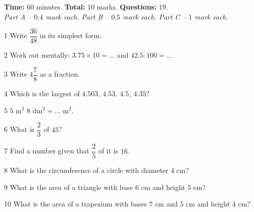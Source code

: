\begin{knowbox}
\textbf{Time:} $60$ minutes. \quad \textbf{Total:} $10$ marks. \quad \textbf{Questions:} $19$.\\[2pt]\emph{Part A -- $0.4$ mark each. \quad Part B -- $0.5$ mark each. \quad Part C -- $1$ mark each.}
\end{knowbox}
\gap
{}
\begin{probbox}{1}{\relax}
Write $\dfrac{36}{48}$ in its simplest form.
\end{probbox}
\gap
\begin{probbox}{2}{\relax}
Work out mentally: $3.75\times10=\ldots$ \quad and \quad $42.5:100=\ldots$
\end{probbox}
\gap
\begin{probbox}{3}{\relax}
Write $4\dfrac78$ as a fraction.
\end{probbox}
\gap
\begin{probbox}{4}{\relax}
Which is the largest of $4.503,\ 4.53,\ 4.5,\ 4.35$?
\end{probbox}
\gap
\begin{probbox}{5}{\relax}
$5$ m$^2$ $8$ dm$^2=\ldots$ m$^2$.
\end{probbox}
\gap
\begin{probbox}{6}{\relax}
What is $\dfrac23$ of $45$?
\end{probbox}
\gap
\begin{probbox}{7}{\relax}
Find a number given that $\dfrac25$ of it is $16$.
\end{probbox}
\gap
\begin{probbox}{8}{\relax}
What is the circumference of a circle with diameter $4$ cm?
\end{probbox}
\gap
\begin{probbox}{9}{\relax}
What is the area of a triangle with base $6$ cm and height $5$ cm?
\end{probbox}
\gap
\begin{probbox}{10}{\relax}
What is the area of a trapezium with bases $7$ cm and $5$ cm and height $4$ cm?
\end{probbox}
